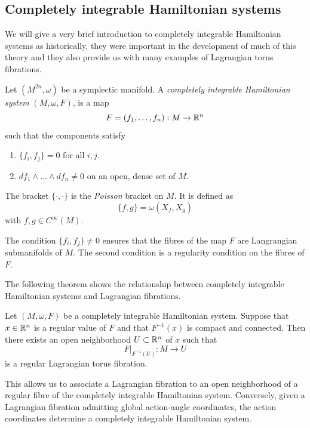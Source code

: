 \subsection{Completely integrable Hamiltonian systems}
We will give a very brief introduction to completely integrable Hamiltonian
systems as historically, they were important in the development of much of this
theory and they also provide us with many examples of Lagrangian torus
fibrations.

\begin{definition}
    Let  $(M^{2n}, \omega)$ be a symplectic manifold. A \emph{completely integrable Hamiltonian
        system} $(M, \omega, F)$, is a map
    $$
        F=(f_1, \dots , f_n) : M \to \mathbb{R}^n
    $$
    such that the components satisfy
    \begin{enumerate}
        \item $\{f_i, f_j\} = 0$ for all $i,j$.
        \item $df_1 \wedge \dots \wedge df_n \neq 0$ on an open, dense set of $M$.
    \end{enumerate}

\end{definition}
\begin{remark}
    The bracket $\{\cdot , \cdot\}$ is the \emph{Poisson} bracket on $M$. It is defined as
    $$
        \{f,g\} = \omega(X_f, X_g)
    $$
    with $f,g \in C^{\infty}(M)$.
\end{remark}
\begin{remark}
    The condition $\{f_i, f_j\} \neq 0$ ensures that the fibres of the map $F$ are Langrangian submanifolds of $M$. The second condition
    is a regularity condition on the fibres of $F$.
\end{remark}

The following theorem shows the relationship between completely integrable
Hamiltonian systems and Lagrangian fibrations.

\begin{theorem}
    Let $(M, \omega, F)$ be a completely integrable Hamiltonian system. Suppose that $x \in \mathbb{R}^n$ is a regular value of $F$ and that
    $F^{-1}(x)$ is compact and connected. Then there exists an open neighborhood $U \subset \mathbb{R}^n$ of $x$ such that
    $$
        F|_{F^{-1}(U)} : M \to U
    $$
    is a regular Lagrangian torus fibration.
\end{theorem}
\begin{remark}
    This allows us to associate a Lagrangian fibration to an open neighborhood of a regular fibre of the completely integrable Hamiltonian system. Conversely, given
    a Lagrangian fibration admitting global action-angle coordinates, the action coordinates determine a completely integrable Hamiltonian system.
\end{remark}
